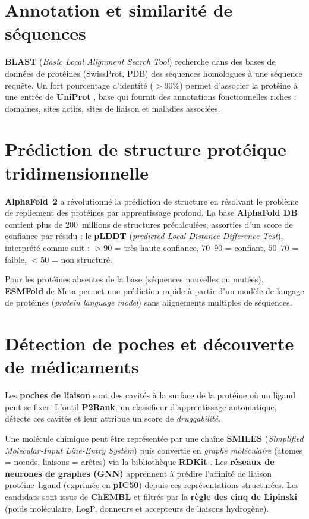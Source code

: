 \documentclass[12pt,a4paper,oneside]{book}
\begin{document}
\section{Annotation et similarité de séquences}

\textbf{BLAST} (\textit{Basic Local Alignment Search Tool})
\cite{altschul1990blast} recherche dans des bases de données de protéines
(SwissProt, PDB) des séquences homologues à une séquence requête. Un fort
pourcentage d'identité ($>90\%$) permet d'associer la protéine à une entrée
de \textbf{UniProt} \cite{uniprot2023}, base qui fournit des annotations
fonctionnelles riches : domaines, sites actifs, sites de liaison et maladies
associées.

\section{Prédiction de structure protéique tridimensionnelle}

\textbf{AlphaFold~2} \cite{jumper2021alphafold} a révolutionné la prédiction
de structure en résolvant le problème de repliement des protéines par
apprentissage profond. La base \textbf{AlphaFold DB} contient plus de
200~millions de structures précalculées, assorties d'un score de confiance
par résidu : le \textbf{pLDDT} (\textit{predicted Local Distance Difference
Test}), interprété comme suit : $>90$ = très haute confiance, $70$--$90$ =
confiant, $50$--$70$ = faible, $<50$ = non structuré.

Pour les protéines absentes de la base (séquences nouvelles ou mutées),
\textbf{ESMFold} \cite{lin2023esmfold} de Meta permet une prédiction rapide
à partir d'un modèle de langage de protéines (\textit{protein language
model}) sans alignements multiples de séquences.

\section{Détection de poches et découverte de médicaments}

Les \textbf{poches de liaison} sont des cavités à la surface de la protéine
où un ligand peut se fixer. L'outil \textbf{P2Rank}, un classifieur
d'apprentissage automatique, détecte ces cavités et leur attribue un score
de \textit{druggabilité}.

Une molécule chimique peut être représentée par une chaîne \textbf{SMILES}
(\textit{Simplified Molecular-Input Line-Entry System}) puis convertie en
\textit{graphe moléculaire} (atomes = nœuds, liaisons = arêtes) via la
bibliothèque \textbf{RDKit} \cite{rdkit}. Les \textbf{réseaux de neurones de
graphes (GNN)} \cite{kipf2017gcn} apprennent à prédire l'affinité de liaison
protéine--ligand (exprimée en \textbf{pIC50}) depuis ces représentations
structurées. Les candidats sont issus de \textbf{ChEMBL}
\cite{gaulton2017chembl} et filtrés par la \textbf{règle des cinq de
Lipinski} \cite{lipinski2001ro5} (poids moléculaire, LogP, donneurs et
accepteurs de liaisons hydrogène).
\end{document}
